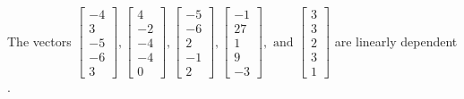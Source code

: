 \begin{exercise}
\begin{exerciseStatement}
  \end{exerciseStatement}
  \begin{exerciseAnswer}
   The vectors \(\left[\begin{array}{r}
-4 \\
3 \\
-5 \\
-6 \\
3
\end{array}\right] , \left[\begin{array}{r}
4 \\
-2 \\
-4 \\
-4 \\
0
\end{array}\right] , \left[\begin{array}{r}
-5 \\
-6 \\
2 \\
-1 \\
2
\end{array}\right] , \left[\begin{array}{r}
-1 \\
27 \\
1 \\
9 \\
-3
\end{array}\right] , \text{ and } \left[\begin{array}{r}
3 \\
3 \\
2 \\
3 \\
1
\end{array}\right]\) are 
  	 linearly dependent  .
  


  \end{exerciseAnswer}
\end{exercise}